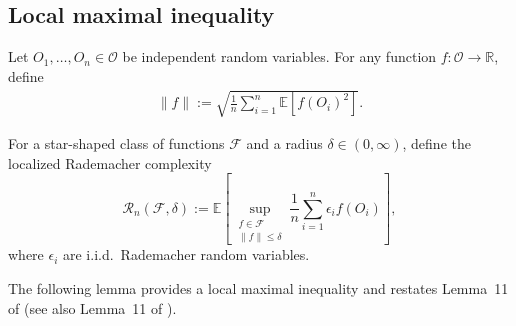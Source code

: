 \documentclass{article}
\theoremstyle{plain}
\theoremstyle{definition}
\theoremstyle{remark}
\begin{document}
 


\subsection{Local maximal inequality}

  Let $O_1,\ldots,O_n \in \mathcal{O}$ be independent random variables. For any function $f:\mathcal{O} \to \mathbb{R}$, define
\begin{align}
    \|f\| := \sqrt{\frac{1}{n} \sum_{i=1}^n\mathbb{E}[f(O_i)^2]}.
\end{align}
 

 


For a star-shaped class of functions $\mathcal{F}$ and a radius $\delta \in (0,\infty)$,
define the localized Rademacher complexity
\[
\mathcal{R}_n(\mathcal{F}, \delta)
:=
\mathbb{E}\left[
\sup_{\substack{f \in \mathcal{F} \\ \|f\| \le \delta}}
\frac{1}{n} \sum_{i=1}^n \epsilon_i f(O_i)
\right],
\]
where $\epsilon_i$ are i.i.d.\ Rademacher random variables.


The following lemma provides a local maximal inequality and restates Lemma~11 of \cite{foster2023orthogonal} (see also Lemma~11 of \citet{van2025nonparametric}).
 
\end{document}
